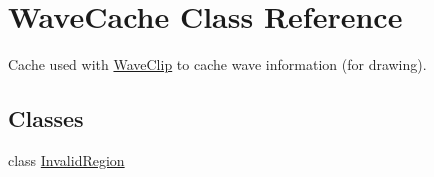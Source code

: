 \hypertarget{class_wave_cache}{}\section{Wave\+Cache Class Reference}
\label{class_wave_cache}


Cache used with \hyperlink{class_wave_clip}{Wave\+Clip} to cache wave information (for drawing).  


\subsection*{Classes}
\begin{DoxyCompactItemize}
\item 
class \hyperlink{class_wave_cache_1_1_invalid_region}{Invalid\+Region}
\end{DoxyCompactItemize}
